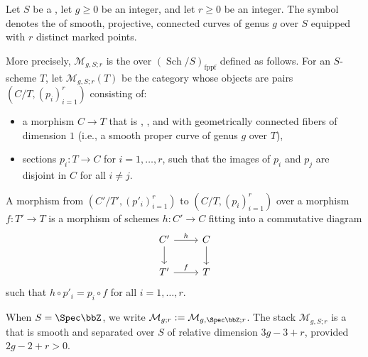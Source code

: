 \begin{definition} \label{definition:moduli_space_of_smooth_projective_connected_curves_with_r_marked_points}
    Let $S$ be a , let $g \geq 0$ be an integer, and let $r \geq 0$ be an integer. The symbol  denotes the  of smooth, projective, connected curves of genus $g$ over $S$ equipped with $r$ distinct marked points.

    More precisely, $\mathcal{M}_{g,S;r}$ is the  over $(\operatorname{Sch}/S)_{\text{fppf}}$ defined as follows. For an $S$-scheme $T$, let $\mathcal{M}_{g,S;r}(T)$ be the category whose objects are pairs $(C/T, (p_i)_{i=1}^r)$ consisting of:
    \begin{itemize}
        \item a morphism $C \to T$ that is , , and  with geometrically connected fibers of dimension $1$ (i.e., a smooth proper curve of genus $g$ over $T$),
        \item sections $p_i: T \to C$ for $i = 1, \dots, r$, such that the images of $p_i$ and $p_j$ are disjoint in $C$ for all $i \neq j$.
    \end{itemize}
    A morphism from $(C'/T', (p'_i)_{i=1}^r)$ to $(C/T, (p_i)_{i=1}^r)$ over a morphism $f: T' \to T$ is a morphism of schemes $h: C' \to C$ fitting into a commutative diagram
    $$\begin{tikzcd}
        C' \ar[r, "h"] \ar[d] & C \ar[d] \\
        T' \ar[r, "f"] & T
    \end{tikzcd}$$
    such that $h \circ p'_i = p_i \circ f$ for all $i = 1, \dots, r$.

    When $S = \Spec \bbZ$, we write $\mathcal{M}_{g;r} := \mathcal{M}_{g,\Spec\bbZ;r}$. The stack $\mathcal{M}_{g,S;r}$ is a  that is smooth and separated over $S$ of relative dimension $3g - 3 + r$, provided $2g - 2 + r > 0$.
\end{definition}
